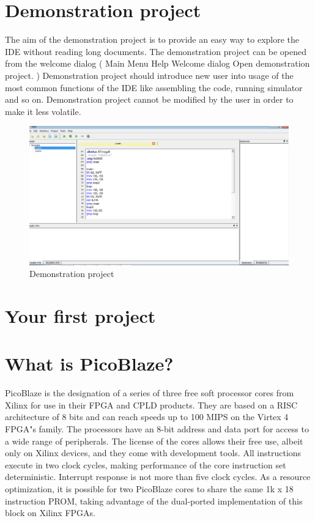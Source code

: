 
\section{Demonstration project}
    The aim of the demonstration project is to provide an easy way to explore the IDE without reading long documents. The demonstration project can be opened from the welcome dialog ( Main Menu Help Welcome dialog Open demonstration project. ) Demonstration project should introduce new user into usage of the most common functions of the IDE like assembling the code, running simulator and so on. Demonstration project cannot be modified by the user in order to make it less volatile.
    \begin{figure}[h]
        \centering{}
        \includegraphics [scale=0.4]{img/Demonstration_project.png}
        \caption{Demonstration project}
    \end{figure}

\section{Your first project}

\section{What is PicoBlaze?}
    PicoBlaze is the designation of a series of three free soft processor cores from Xilinx for use in their FPGA and CPLD products. They are based on a RISC architecture of 8 bits and can reach speeds up to 100 MIPS on the Virtex 4 FPGA"s family. The processors have an 8-bit address and data port for access to a wide range of peripherals. The license of the cores allows their free use, albeit only on Xilinx devices, and they come with development tools. All instructions execute in two clock cycles, making performance of the core instruction set deterministic. Interrupt response is not more than five clock cycles. As a resource optimization, it is possible for two PicoBlaze cores to share the same 1k x 18 instruction PROM, taking advantage of the dual-ported implementation of this block on Xilinx FPGAs.

